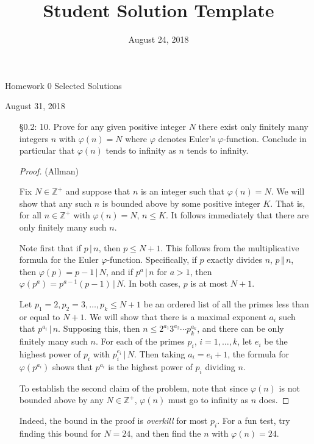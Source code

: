 \documentclass{report}
\title{Student Solution Template}
\date{August 24, 2018}
\newcommand{\assignmentNumber}[1]{Homework #1 Selected Solutions}
\newcommand{\duedate}[1]{#1}
\newcommand\Z{{\mathbb Z}}
\theoremstyle{plain}
\begin{document}
 

\centerline{\sc \Large \assignmentNumber{$0$}}
\smallskip
\centerline{\duedate{August 31, 2018}}

\begin{enumerate}

\item[\S 0.2: 10.] Prove for any given positive integer $N$ there exist only finitely many integers $n$ with 
$\varphi(n) = N$ where $\varphi$ denotes Euler's $\varphi$-function.  Conclude in particular that $\varphi(n)$
tends to infinity as $n$ tends to infinity.

\begin{proof} (Allman) 

Fix $N \in \Z^+$ and suppose that $n$ is an integer such that $\varphi(n) = N$.  We will show that any such
$n$ is bounded above by some positive integer $K$.  That is, for all $n \in \Z^+$ with $\varphi(n) = N$,
$n \le K$.  It follows immediately that there are only finitely many such $n$.

Note first that if $p \, \vert \, n$, then $p \le N+1$.  This follows from the multiplicative formula for the Euler $\varphi$-function.
Specifically, if $p$ exactly divides $n$, $p \,\Vert \, n$, then $\varphi(p) = p-1 \, \vert \, N$, and if $p^a \, \vert \, n$ for
$a > 1$, then $\varphi(p^a) = p^{a-1} (p-1) \, \vert \, N$.  In both cases, $p$ is at most $N+1$.

Let $p_1 = 2, p_2 = 3, \dots, p_k \le N+1$ be an ordered list of all the primes less than or equal to $N+1$.  We will show that there
is a maximal exponent $a_i$ such that $p^{a_i} \, \vert \, n$.  Supposing this, then $n \le 2^{a_1} 3^{a_2} \cdots p_k^{a_k}$, and there
can be only finitely many such $n$.  For each of the primes $p_i$, $i = 1, \dots, k$, let $e_i$ be the highest power of $p_i$
with $p_i^{e_i} \, \vert \, N$.  Then taking $a_i = e_i +1$, the formula for $\varphi(p^{a_i})$ shows that 
$p^{a_i}$ is the highest power of $p_i$ dividing $n$.

\smallskip

To establish the second claim of the problem, note that since $\varphi(n)$ is not bounded above by any $N \in \Z^+$, $\varphi(n)$ must
go to infinity as $n$ does.
\end{proof}

Indeed, the bound in the proof is \emph{overkill} for most $p_i$.  For a fun test, try finding this
bound for $N= 24$, and then find the $n$ with $\varphi(n) = 24$.


\end{enumerate}
\end{document}
